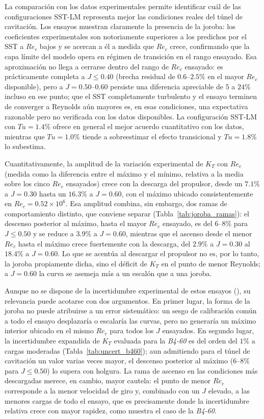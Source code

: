 La comparación con los datos experimentales permite identificar cuál de las
configuraciones SST-LM representa mejor las condiciones reales del túnel de
cavitación. Los ensayos muestran claramente la presencia de la joroba: los
coeficientes experimentales son notoriamente superiores a los predichos por el SST a
$Re_c$ bajos y se acercan a él a medida que $Re_c$ crece, confirmando que la capa
límite del modelo opera en régimen de transición en el rango ensayado. Esa aproximación
no llega a cerrarse dentro del rango de $Re_c$ ensayado: es prácticamente completa a
$J\leq0.40$ (brecha residual de $0.6$--$2.5\%$ en el mayor $Re_c$ disponible), pero a
$J=0.50$--$0.60$ persiste una diferencia apreciable de $5$ a $24\%$ incluso en ese
punto; que el SST completamente turbulento y el ensayo terminen de converger a
Reynolds aún mayores es, en esas condiciones, una expectativa razonable pero no
verificada con los datos disponibles. La
configuración SST-LM con $Tu = 1.4\%$ ofrece en general el mejor acuerdo cuantitativo
con los datos, mientras que $Tu = 1.0\%$ tiende a sobreestimar el efecto transicional
y $Tu = 1.8\%$ lo subestima.

Cuantitativamente, la amplitud de la variación experimental de $K_T$ con $Re_c$ (medida
como la diferencia entre el máximo y el mínimo, relativa a la media sobre los cinco $Re_c$
ensayados) crece con la descarga del propulsor, desde un $7.1\%$ a $J=0.30$ hasta un
$16.3\%$ a $J=0.60$, con el máximo ubicado consistentemente en $Re_c = 0.52\times10^6$.
Esa amplitud combina, sin embargo, dos ramas de comportamiento distinto, que conviene
separar (Tabla~\ref{tab:joroba_ramas}): el descenso posterior al máximo, hasta el mayor
$Re_c$ ensayado, es del $6$--$8\%$ para $J\leq0.50$ y se reduce a $3.9\%$ a $J=0.60$,
mientras que el ascenso desde el menor $Re_c$ hasta el máximo crece fuertemente con la
descarga, del $2.9\%$ a $J=0.30$ al $18.4\%$ a $J=0.60$. Lo que se acentúa al descargar
el propulsor no es, por lo tanto, la joroba propiamente dicha, sino el déficit de $K_T$
en el punto de menor Reynolds; a $J=0.60$ la curva se asemeja más a un escalón que a una
joroba.

Aunque no se dispone de la incertidumbre experimental de estos ensayos
(), su relevancia puede
acotarse con dos argumentos. En primer lugar, la forma de la joroba no puede
atribuirse a un error sistemático: un sesgo de calibración común a todo el ensayo
desplazaría o escalaría las curvas, pero no generaría un máximo interior ubicado en
el mismo $Re_c$ para todos los $J$ ensayados. En segundo lugar, la incertidumbre
expandida de $K_T$ evaluada para la \textit{B4-60} es del orden del $1\%$ a cargas
moderadas (Tabla~\ref{tab:uncert_b460}); aun admitiendo para el túnel de cavitación
un valor varias veces mayor, el descenso posterior al máximo ($6$--$8\%$ para
$J\leq0.50$) lo supera con holgura. La rama de ascenso en las condiciones más
descargadas merece, en cambio, mayor cautela: el punto de menor $Re_c$ corresponde a
la menor velocidad de giro y, combinado con un $J$ elevado, a las menores cargas de
todo el ensayo, que es precisamente donde la incertidumbre relativa crece con mayor
rapidez, como muestra el caso de la \textit{B4-60}.


